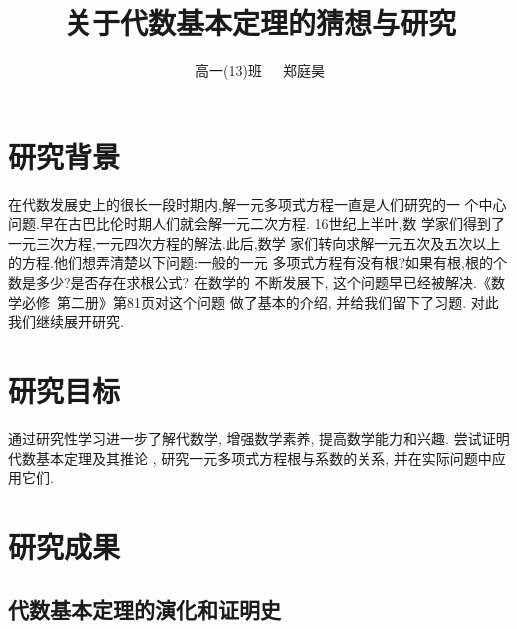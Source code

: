 \documentclass[12pt,a4paper]{ctexart}
\title{\zihao{-2}关于代数基本定理的猜想与研究}
\author{高一(13)班\ \ \ 郑庭昊}
\begin{document}
\maketitle
{}
\tableofcontents
\newpage
{}


\setlength{\abovedisplayskip}{3pt}
\setlength{\belowdisplayskip}{3pt}

\section{研究背景}
 {
  \fangsong 在代数发展史上的很长一段时期内,解一元多项式方程一直是人们研究的一
  个中心问题.早在古巴比伦时期人们就会解一元二次方程. 16世纪上半叶,数
  学家们得到了一元三次方程,一元四次方程的解法.此后,数学
  家们转向求解一元五次及五次以上的方程.他们想弄清楚以下问题:一般的一元
  多项式方程有没有根?如果有根,根的个数是多少?是否存在求根公式? 在数学的
  不断发展下, 这个问题早已经被解决.《数学必修\ 第二册》第81页对这个问题
  做了基本的介绍, 并给我们留下了习题. 对此我们继续展开研究.

 }

\section{研究目标}

 {
  \fangsong 通过研究性学习进一步了解代数学, 增强数学素养, 提高数学能力和兴趣. 尝试证明代数基本定理及其推论
  , 研究一元多项式方程根与系数的关系, 并在实际问题中应用它们.

 }

\section{研究成果}

\subsection{代数基本定理的演化和证明史}
\end{document}
